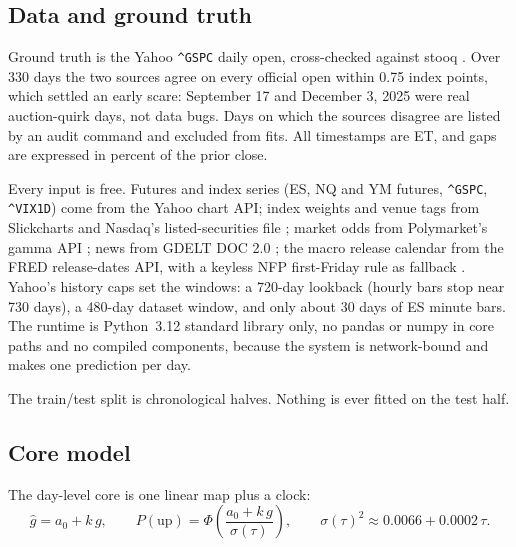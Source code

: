 \label{sec:method}

\subsection{Data and ground truth}
\label{sec:data}

Ground truth is the Yahoo \texttt{\^{}GSPC} daily open, cross-checked against
stooq \citep{yahoo2026chartapi,stooq2026spx}. Over 330 days the two
sources agree on every official open within 0.75 index points, which settled
an early scare: September 17 and December 3, 2025 were real auction-quirk
days, not data bugs. Days on which the sources disagree are listed by an
audit command and excluded from fits. All timestamps are ET, and gaps are
expressed in percent of the prior close.

Every input is free. Futures and index series (ES, NQ and YM futures,
\texttt{\^{}GSPC}, \texttt{\^{}VIX1D}) come from the Yahoo chart API; index
weights and venue tags from Slickcharts and Nasdaq's listed-securities file
\citep{slickcharts2026sp500,nasdaqtrader2026listed}; market odds from
Polymarket's gamma API \citep{polymarket2026gamma}; news from GDELT DOC
2.0 \citep{gdelt2017doc}; the macro release calendar from the FRED
release-dates API, with a keyless NFP first-Friday rule as fallback
\citep{fred2026releasedates}. Yahoo's history caps set the windows: a
720-day lookback (hourly bars stop near 730 days), a 480-day dataset window,
and only about 30 days of ES minute bars. The runtime is Python~3.12
standard library only, no pandas or numpy in core paths and no compiled
components, because the system is network-bound and makes one prediction
per day.

The train/test split is chronological halves. Nothing is ever fitted on the
test half.

\subsection{Core model}
\label{sec:core_model}

The day-level core is one linear map plus a clock:
\begin{equation}
\hat g = a_0 + k\,g, \qquad
P(\mathrm{up}) = \Phi\!\left(\frac{a_0 + k\,g}{\sigma(\tau)}\right), \qquad
\sigma(\tau)^2 \approx 0.0066 + 0.0002\,\tau .
\label{eq:core}
\end{equation}

